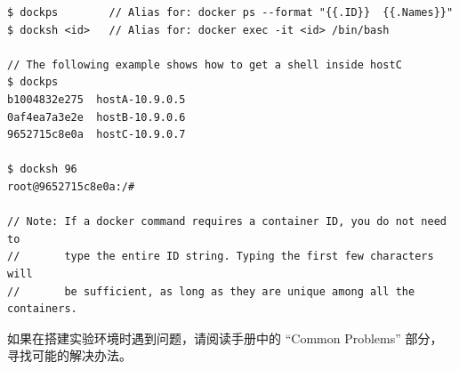 \begin{lstlisting}
$ dockps        // Alias for: docker ps --format "{{.ID}}  {{.Names}}" 
$ docksh <id>   // Alias for: docker exec -it <id> /bin/bash

// The following example shows how to get a shell inside hostC
$ dockps
b1004832e275  hostA-10.9.0.5
0af4ea7a3e2e  hostB-10.9.0.6
9652715c8e0a  hostC-10.9.0.7

$ docksh 96
root@9652715c8e0a:/#  

// Note: If a docker command requires a container ID, you do not need to 
//       type the entire ID string. Typing the first few characters will 
//       be sufficient, as long as they are unique among all the containers. 
\end{lstlisting}


如果在搭建实验环境时遇到问题，请阅读手册中的 ``Common Problems'' 部分，
寻找可能的解决办法。

